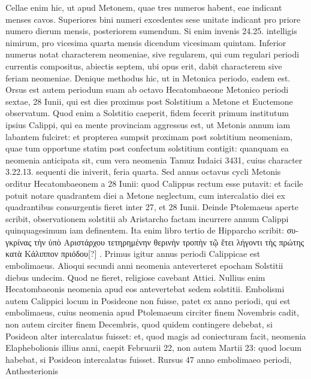 Cellae
enim hic, ut apud Metonem, quae tres numeros habent, eae indicant
menses cavos.
Superiores bini numeri excedentes sese unitate indicant
pro priore numero dierum mensis, posteriorem sumendum.
Si enim
invenis 24.25. intelligis nimirum, pro vicesima quarta mensis dicendum
vicesimam quintam.
Inferior numerus notat characterem neomeniae,
sive regularem, qui cum regulari periodi currentis compositus,
abiectis septem, ubi opus erit, dabit characterem sive feriam neomeniae.
Denique methodus hic, ut in Metonica periodo, eadem est.
Orsus est autem periodum suam ab octavo Hecatombaeone Metonico
periodi sextae, 28 Iunii, qui est dies proximus post Solstitium a
Metone et Euctemone observatum.
Quod enim a Solstitio caeperit,
fidem fecerit primum institutum ipsius Calippi, qui ea mente provinciam
aggressus est, ut Metonis annum iam labantem fulciret: et propterea
sumpsit proximam post solstitium neomeniam, quae tum opportune
statim post confectum solstitium contigit: quanquam ea neomenia
anticipata sit, cum vera neomenia Tamuz Iudaici 3431, cuius
character 3.22.13. sequenti die iniverit, feria quarta.
%
Sed annus octavus
cycli Metonis orditur Hecatombaeonem a 28 Iunii: quod Calippus
rectum esse putavit: et facile potuit notare quadrantem diei a Metone
neglectum, cum intercalatio diei ex quadrantibus consurgentis fieret
inter 27, et 28 Iunii.
Deinde Ptolemaeus aperte scribit, observationem
solstitii ab Aristarcho factam incurrere annum Calippi quinquagesimum
iam definentem.
Ita enim libro tertio de Hipparcho
scribit: \textgreek{συγκρίνας τὴν ὑπὸ Αριστάρχου τετηρημένην
 θερινὴν τροπὴν τῷ 
ἔτει λήγοντι τὴς πρώτης κατὰ Κάλιππον πριόδου[?]} .
Primus igitur annus periodi
Calippicae est embolimaeus.
Alioqui secundi anni neomenia anteverteret
epocham Solstitii diebus undecim.
Quod ne fieret, religiose cavebant
Attici.
Nullius enim Hecatombaeonis neomenia apud eos antevertebat
sedem solstitii.
Embolismi autem Calippici locum in Posideone
non fuisse, patet ex  anno periodi, qui est embolimaeus,
cuius neomenia apud Ptolemaeum circiter finem Novembris cadit, non
autem circiter finem Decembris, quod quidem contingere debebat,
si Posideon alter intercalatus fuisset: et, quod magis ad coniecturam
facit, neomenia Elaphebolionis illius anni, caepit Februarii
22, non autem Martii 23: quod locum habebat, si Posideon intercalatus
fuisset.
Rursus 47 anno embolimaeo periodi, Anthesterionis
